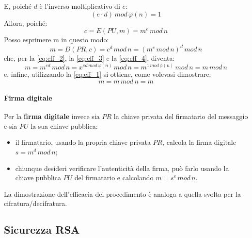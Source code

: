 E, poiché $d$ è l'inverso moltiplicativo di $e$:
\begin{equation} \label{eq:eff_4}
(e \cdot d) \, mod \, \varphi(n) = 1
\end{equation}
Allora, poiché:
\begin{equation}
c=E(PU,m) = m^e \, mod \, n
\end{equation}
Posso esprimere m in questo modo:
\begin{equation}
m=D(PR,c) = c^d \, mod \, n = (m^e \, mod \, n)^d \, mod \, n
\end{equation}
che, per la \ref{eq:eff_2}, la \ref{eq:eff_3} e la \ref{eq:eff_4}, diventa:
\begin{equation}
m =  m^{ed} \, mod \, n = x^{ed \, mod \, \varphi(n)} \, mod \, n = m^{1 \, mod \, \phi(n)} \, mod \, n = m \, mod \, n
\end{equation}
e, infine, utilizzando la \ref{eq:eff_1} si ottiene, come volevasi dimostrare:
\begin{equation}
m = m \, mod \, n = m
\end{equation}

\paragraph{Firma digitale}
Per la \textbf{firma digitale} invece sia $PR$ la chiave privata del firmatario del messaggio e sia $PU$ la sua chiave pubblica: 
\begin{itemize}
\item il firmatario, usando la propria chiave privata $PR$, calcola la firma digitale $s = m^d \, mod \, n$;
\item chiunque desideri verificare l'autenticità della firma, può farlo usando la chiave pubblica $PU$ del firmatario e calcolando $m = s^e \, mod \, n$.
\end{itemize}
La dimostrazione dell'efficacia del procedimento è analoga a quella svolta per la cifratura/decifratura.

\subsection{Sicurezza RSA}

